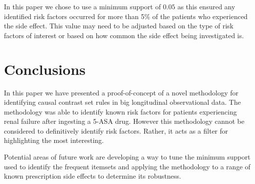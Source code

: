 \documentclass{llncs}
\begin{document}
In this paper we chose to use a minimum support of $0.05$ as this ensured any identified risk factors occurred for more than 5\% of the patients who experienced the side effect. This value may need to be adjusted based on the type of risk factors of interest or based on how common the side effect being investigated is.

\section{Conclusions}
In this paper we have presented a proof-of-concept of a novel methodology for identifying causal contrast set rules in big longitudinal observational data. The methodology was able to identify known risk factors for patients experiencing renal failure after ingesting a 5-ASA drug. However this methodology cannot be considered to definitively identify risk factors. Rather, it acts as a filter for highlighting the most interesting.

Potential areas of future work are developing a way to tune the minimum support used to identify the frequent itemsets and applying the methodology to a range of known prescription side effects to determine its robustness.



\end{document}
